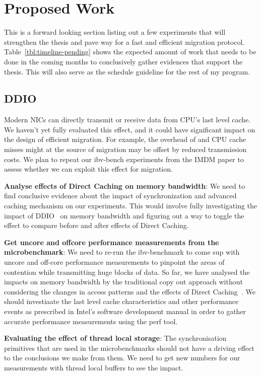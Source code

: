 
\chapter{Proposed Work}
\label{chap:proposed-work}
This is a forward looking section listing out a few experiments that will
strengthen the thesis and pave way for a fast and efficient migration protocol.
Table~\ref{tbl:timeline-pending} shows the expected amount of work that needs to be done 
in the coming months to conclusively gather evidences that support the thesis. 
This will also serve as the schedule guideline for the rest of my program.


\section{DDIO}
Modern NICs can directly transmit or receive data from CPU's last level cache.
We haven’t yet fully evaluated this effect, and it could have significant impact on
the design of efficient migration. For example, the overhead of \memcpy and CPU
cache misses might at the source of migration may be offset by reduced transmission
costs. We plan to repeat our ibv-bench experiments from the IMDM paper
to assess whether we can exploit this effect for migration.


\textbf{Analyse effects of Direct Caching on memory bandwidth}: We need to find conclusive evidence about the impact of synchronization and 
advanced caching mechanism on our experiments. This would involve fully 
investigating the impact of DDIO~\cite{ddio} on memory bandwidth and figuring out 
a way to toggle the effect to compare before and after effects of Direct Caching.

\textbf{Get uncore and offcore performance measurements from the microbenchmark}: 
We need to re-run the ibv-benchmark to come sup with uncore and off-core performance
measurements to pinpoint the areas of contention while transmitting huge blocks
of data. So far, we have analysed the impacts on memory bandwidth by the traditional
copy out approach without considering the changes in access patterns and the effects
of Direct Caching~\cite{dca}. We should investiaate the last level cache characteristics 
and other performance events as prescribed in Intel\textregistered 's software development
manual in order to gather accurate performance measurements using the perf tool.

\textbf{Evaluating the effect of thread local storage}: The synchronisation primitives 
that are used in the microbenchmarks should not have a driving effect to the 
conclusions we make from them. We need to get new numbers for our measurements with
thread local buffers to see the impact.

